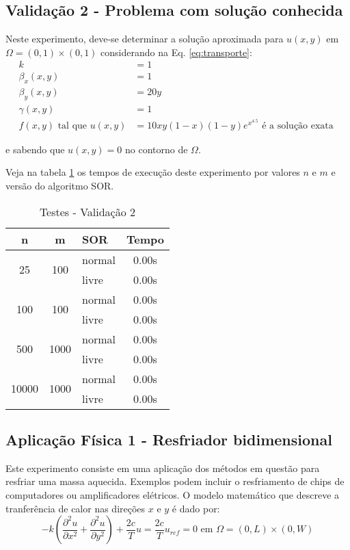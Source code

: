 \documentclass[
	11pt,				%
	oneside,			%
	a4paper,			%
	english,			%
	brazil,				%
	]{article}
\begin{document}
\subsection{Validação 2 - Problema com solução conhecida}
Neste experimento, deve-se determinar a solução aproximada para
$u(x,y)$ em $\Omega = (0,1) \times (0,1)$ considerando na Eq. 
\eqref{eq:transporte}:
\begin{align}\label{eq:v2}
k &= 1\nonumber \\
\beta_x(x,y) &= 1\nonumber \\
\beta_y(x,y) &= 20y\nonumber \\
\gamma(x,y) &= 1\nonumber \\
f(x,y) \text{ tal que } u(x,y) &= 10xy(1-x)(1-y)e^{x^{4.5}}
\text{ é a solução exata }
\end{align}

e sabendo que $u(x,y) = 0$ no contorno de $\Omega$.

Veja na tabela \ref{tab:tv2} os tempos de execução deste experimento
por valores $n$ e $m$ e versão do algoritmo SOR.

\begin{table}[ht]
\centering
\begin{tabular}{|c|c|l|c|}
\hline 
\textbf{n} & \textbf{m} & \textbf{SOR} & \textbf{Tempo} \\
\hline
\multirow{2}{*}{25}    & \multirow{2}{*}{100}  & normal & 0.00s \\
                       &                       & livre  & 0.00s \\
\hline
\multirow{2}{*}{100}   & \multirow{2}{*}{100}  & normal & 0.00s \\
                       &                       & livre  & 0.00s \\
\hline
\multirow{2}{*}{500}   & \multirow{2}{*}{1000} & normal & 0.00s \\
                       &                       & livre  & 0.00s \\
\hline
\multirow{2}{*}{10000} & \multirow{2}{*}{1000} & normal & 0.00s \\
                       &                       & livre  & 0.00s \\
\hline
\end{tabular}
\caption{Testes - Validação 2}
\label{tab:tv2}
\end{table}

\subsection{Aplicação Física 1 - Resfriador bidimensional}
Este experimento consiste em uma aplicação dos métodos em questão para
resfriar uma massa aquecida. Exemplos podem incluir o resfriamento de
chips de computadores ou amplificadores elétricos. O modelo matemático
que descreve a tranferência de calor nas direções $x$ e $y$ é dado por:
\begin{equation} \label{eq:a1}
- k\left(\frac{\partial^2 u}{\partial x^2} + \frac{\partial^2 u}{\partial 
y^2}\right) + \frac{2c}{T}u = \frac{2c}{T}u_{ref} = 0 \text{   em   }
\Omega = (0,L) \times (0, W)
\end{equation}
\end{document}
